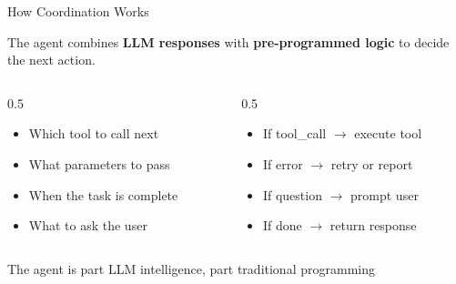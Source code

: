 \documentclass[aspectratio=169]{beamer}
\begin{document}
\begin{frame}{How Coordination Works}
\begin{shadedbox}
The agent combines \textbf{LLM responses} with \textbf{pre-programmed logic} to decide the next action.
\end{shadedbox}
\vspace{0.3cm}
\begin{columns}[T]
\begin{column}{0.5\textwidth}
\begin{shadedbox}[title=\textbf{LLM Decides}]
\begin{itemize}\small
  \item Which tool to call next
  \item What parameters to pass
  \item When the task is complete
  \item What to ask the user
\end{itemize}
\end{shadedbox}
\end{column}
\begin{column}{0.5\textwidth}
\begin{shadedbox}[title=\textbf{Code Decides}]
\begin{itemize}\small
  \item If tool\_call $\rightarrow$ execute tool
  \item If error $\rightarrow$ retry or report
  \item If question $\rightarrow$ prompt user
  \item If done $\rightarrow$ return response
\end{itemize}
\end{shadedbox}
\end{column}
\end{columns}
\vspace{0.3cm}
\begin{center}
\alert{The agent is part LLM intelligence, part traditional programming}
\end{center}
\end{frame}
\end{document}

